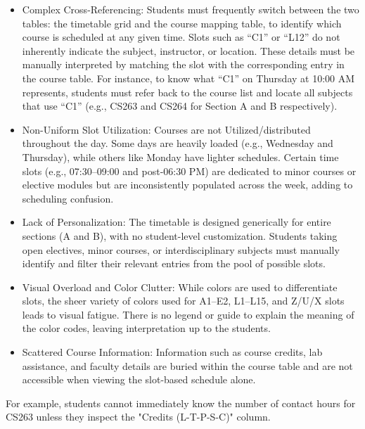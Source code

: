 \documentclass[a4paper,12pt]{article}
\begin{document}
\begin{itemize}
    \item Complex Cross-Referencing:
    \newline
Students must frequently switch between the two tables: the timetable grid and the course mapping table, to identify which course is scheduled at any given time.
\newline
Slots such as “C1” or “L12” do not inherently indicate the subject, instructor, or location. These details must be manually interpreted by matching the slot with the corresponding entry in the course table.
\newline
For instance, to know what “C1” on Thursday at 10:00 AM represents, students must refer back to the course list and locate all subjects that use “C1” (e.g., CS263 and CS264 for Section A and B respectively).
\item Non-Uniform Slot Utilization:
\newline
Courses are not Utilized/distributed throughout the day. Some days are heavily loaded (e.g., Wednesday and Thursday), while others like Monday have lighter schedules.
\newline
Certain time slots (e.g., 07:30–09:00 and post-06:30 PM) are dedicated to minor courses or elective modules but are inconsistently populated across the week, adding to scheduling confusion.
\item Lack of Personalization:
\newline
The timetable is designed generically for entire sections (A and B), with no student-level customization.
\newline
Students taking open electives, minor courses, or interdisciplinary subjects must manually identify and filter their relevant entries from the pool of possible slots.
\item Visual Overload and Color Clutter:
\newline
While colors are used to differentiate slots, the sheer variety of colors used for A1–E2, L1–L15, and Z/U/X slots leads to visual fatigue.
\newline
There is no legend or guide to explain the meaning of the color codes, leaving interpretation up to the students.
\item Scattered Course Information:
\newline
Information such as course credits, lab assistance, and faculty details are buried within the course table and are not accessible when viewing the slot-based schedule alone.
\end{itemize}
For example, students cannot immediately know the number of contact hours for CS263 unless they inspect the "Credits (L-T-P-S-C)" column.
\end{document}
